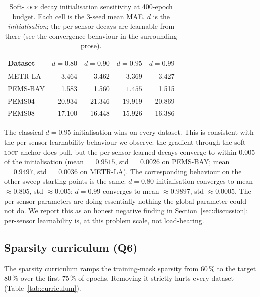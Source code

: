 \documentclass[11pt]{article}
\newcommand{\LOCF}{\textsc{locf}\xspace}
\begin{document}
\begin{table}[!htbp]
\centering
\caption{Soft-\LOCF decay initialisation sensitivity at 400-epoch
budget.  Each cell is the 3-seed mean MAE.  $d$ is the
\emph{initialisation}; the per-sensor decays are learnable from there
(see the convergence behaviour in the surrounding prose).}
\label{tab:decay}
\small
\begin{tabular}{lrrrr}
\toprule
\textbf{Dataset} & $d{=}0.80$ & $d{=}0.90$ & $d{=}0.95$ & $d{=}0.99$ \\
\midrule
METR-LA  & 3.464  & 3.462  & $\mathbf{3.369}$  & 3.427  \\
PEMS-BAY & 1.583  & 1.560  & $\mathbf{1.455}$  & 1.515  \\
PEMS04   & 20.934 & 21.346 & $\mathbf{19.919}$ & 20.869 \\
PEMS08   & 17.100 & 16.448 & $\mathbf{15.926}$ & 16.386 \\
\bottomrule
\end{tabular}
\end{table}

The classical $d = 0.95$ initialisation wins on every dataset.  This
is consistent with the per-sensor learnability behaviour we observe:
the gradient through the soft-\LOCF anchor does pull, but the
per-sensor learned decays converge to within 0.005 of the
initialisation (mean $= 0.9515$, std $= 0.0026$ on PEMS-BAY; mean
$= 0.9497$, std $= 0.0036$ on METR-LA).  The corresponding behaviour
on the other sweep starting points is the same: $d = 0.80$
initialisation converges to mean $\approx 0.805$, std $\approx 0.005$;
$d = 0.99$ converges to mean $\approx 0.9897$, std $\approx 0.0005$.
The per-sensor parameters are doing essentially nothing the global
parameter could not do.  We report this as an honest negative finding
in Section~\ref{sec:discussion}: per-sensor learnability is, at this
problem scale, not load-bearing.

\subsection{Sparsity curriculum (Q6)}
\label{sec:results-curr}

The sparsity curriculum ramps the training-mask sparsity from 60\,\%
to the target 80\,\% over the first 75\,\% of epochs.  Removing it
strictly hurts every dataset (Table~\ref{tab:curriculum}).
\end{document}
